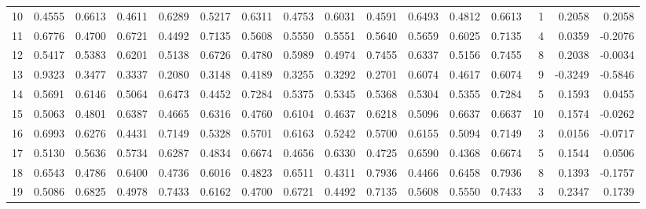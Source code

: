 \begin{tabular}{lrrrrrrrrrrrrrrr}
10 &      0.4555 &  0.6613 &  0.4611 &  0.6289 &  0.5217 &  0.6311 &  0.4753 &  0.6031 &  0.4591 &  0.6493 &   0.4812 &     0.6613 &      1 &                    0.2058 &                     0.2058 \\
11 &      0.6776 &  0.4700 &  0.6721 &  0.4492 &  0.7135 &  0.5608 &  0.5550 &  0.5551 &  0.5640 &  0.5659 &   0.6025 &     0.7135 &      4 &                    0.0359 &                    -0.2076 \\
12 &      0.5417 &  0.5383 &  0.6201 &  0.5138 &  0.6726 &  0.4780 &  0.5989 &  0.4974 &  0.7455 &  0.6337 &   0.5156 &     0.7455 &      8 &                    0.2038 &                    -0.0034 \\
13 &      0.9323 &  0.3477 &  0.3337 &  0.2080 &  0.3148 &  0.4189 &  0.3255 &  0.3292 &  0.2701 &  0.6074 &   0.4617 &     0.6074 &      9 &                   -0.3249 &                    -0.5846 \\
14 &      0.5691 &  0.6146 &  0.5064 &  0.6473 &  0.4452 &  0.7284 &  0.5375 &  0.5345 &  0.5368 &  0.5304 &   0.5355 &     0.7284 &      5 &                    0.1593 &                     0.0455 \\
15 &      0.5063 &  0.4801 &  0.6387 &  0.4665 &  0.6316 &  0.4760 &  0.6104 &  0.4637 &  0.6218 &  0.5096 &   0.6637 &     0.6637 &     10 &                    0.1574 &                    -0.0262 \\
16 &      0.6993 &  0.6276 &  0.4431 &  0.7149 &  0.5328 &  0.5701 &  0.6163 &  0.5242 &  0.5700 &  0.6155 &   0.5094 &     0.7149 &      3 &                    0.0156 &                    -0.0717 \\
17 &      0.5130 &  0.5636 &  0.5734 &  0.6287 &  0.4834 &  0.6674 &  0.4656 &  0.6330 &  0.4725 &  0.6590 &   0.4368 &     0.6674 &      5 &                    0.1544 &                     0.0506 \\
18 &      0.6543 &  0.4786 &  0.6400 &  0.4736 &  0.6016 &  0.4823 &  0.6511 &  0.4311 &  0.7936 &  0.4466 &   0.6458 &     0.7936 &      8 &                    0.1393 &                    -0.1757 \\
19 &      0.5086 &  0.6825 &  0.4978 &  0.7433 &  0.6162 &  0.4700 &  0.6721 &  0.4492 &  0.7135 &  0.5608 &   0.5550 &     0.7433 &      3 &                    0.2347 &                     0.1739 \\
\bottomrule
\end{tabular}
